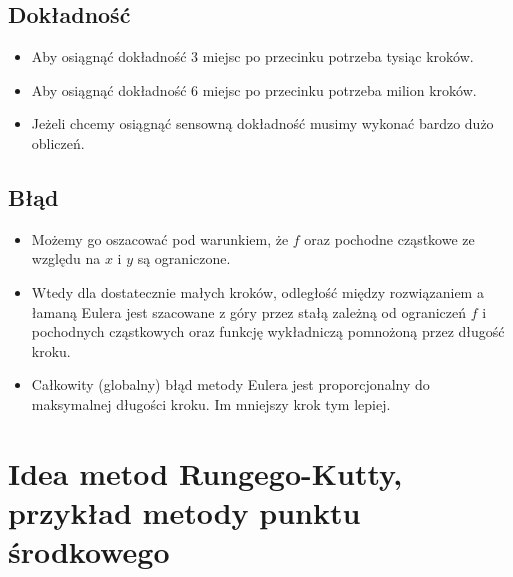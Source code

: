 \documentclass[a4paper]{article}
\begin{document}
\subsection{Dokładność}
\begin{itemize}
    \item Aby osiągnąć dokładność 3 miejsc po przecinku potrzeba tysiąc kroków.
    \item Aby osiągnąć dokładność 6 miejsc po przecinku potrzeba milion kroków.
    \item Jeżeli chcemy osiągnąć sensowną dokładność musimy wykonać bardzo dużo obliczeń.
\end{itemize}

\subsection{Błąd}
\begin{itemize}
    \item Możemy go oszacować pod warunkiem, że $f$ oraz pochodne cząstkowe ze względu na $x$ i $y$ są ograniczone.
    \item Wtedy dla dostatecznie małych kroków, odległość między rozwiązaniem a łamaną Eulera jest szacowane z góry przez stałą zależną od ograniczeń $f$ i pochodnych cząstkowych oraz funkcję wykładniczą pomnożoną przez długość kroku.
    \item Całkowity (globalny) błąd metody Eulera jest proporcjonalny do maksymalnej długości kroku. Im mniejszy krok tym lepiej.
\end{itemize}

\section{Idea metod Rungego-Kutty, przykład metody punktu środkowego}
\end{document}
